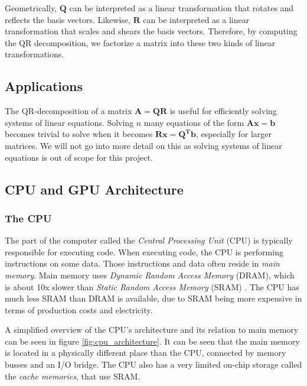Geometrically, \(\mathbf{Q}\) can be interpreted as a linear transformation that rotates and reflects the basis vectors. Likewise, \(\mathbf{R}\) can be interpreted as a linear transformation that scales and shears the basis vectors. Therefore, by computing the QR decomposition, we factorize a matrix into these two kinds of linear transformations. 


\subsection*{Applications}
The QR-decomposition of a matrix \(\mathbf{A = QR}\) is useful for efficiently solving systems of linear equations. Solving $n$ many equations of the form \(\mathbf{Ax = b}\) becomes trivial to solve when it becomes \(\mathbf{Rx = Q^Tb}\), especially for larger matrices.\cite[Sect. 2.10]{numericalrecipes} We will not go into more detail on this as solving systems of linear equations is out of scope for this project. 

\newpage
\subsection{CPU and GPU Architecture}

\subsubsection{The CPU}

The part of the computer called the \textit{Central Processing Unit} (CPU) is typically responsible for executing code. When executing code, the CPU is performing instructions on some data. Those instructions and data often reside in \textit{main memory}. Main memory uses \textit{Dynamic Random Access Memory} (DRAM), which is about 10x slower than \textit{Static Random Access Memory} (SRAM) \cite[p. 561-562]{computersystems}. The CPU has much less SRAM than DRAM is available, due to SRAM being more expensive in terms of production costs and electricity.

A simplified overview of the CPU's architecture and its relation to main memory can be seen in figure \ref{fig:cpu_architecture}. It can be seen that the main memory is located in a physically different place than the CPU, connected by memory busses and an I/O bridge. The CPU also has a very limited on-chip storage called the \textit{cache memories}, that use SRAM.

